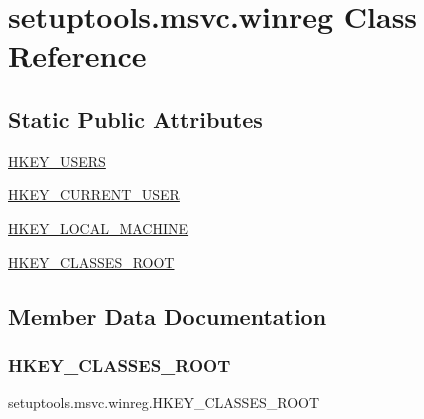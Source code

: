 \hypertarget{classsetuptools_1_1msvc_1_1winreg}{}\section{setuptools.\+msvc.\+winreg Class Reference}
\label{classsetuptools_1_1msvc_1_1winreg}
\subsection*{Static Public Attributes}
\begin{DoxyCompactItemize}
\item 
\hyperlink{classsetuptools_1_1msvc_1_1winreg_a4589470fcc8687a720dbbeffcb07e2d6}{H\+K\+E\+Y\+\_\+\+U\+S\+E\+RS}
\item 
\hyperlink{classsetuptools_1_1msvc_1_1winreg_a873136afb15608b6a5e8d0851167d65e}{H\+K\+E\+Y\+\_\+\+C\+U\+R\+R\+E\+N\+T\+\_\+\+U\+S\+ER}
\item 
\hyperlink{classsetuptools_1_1msvc_1_1winreg_a656edb234e98d04b5eb57233f70a78a2}{H\+K\+E\+Y\+\_\+\+L\+O\+C\+A\+L\+\_\+\+M\+A\+C\+H\+I\+NE}
\item 
\hyperlink{classsetuptools_1_1msvc_1_1winreg_a394ca1161b4e6dc25fe50329c6053b60}{H\+K\+E\+Y\+\_\+\+C\+L\+A\+S\+S\+E\+S\+\_\+\+R\+O\+OT}
\end{DoxyCompactItemize}


\subsection{Member Data Documentation}
\mbox{\label{classsetuptools_1_1msvc_1_1winreg_a394ca1161b4e6dc25fe50329c6053b60}} 
\subsubsection{\texorpdfstring{H\+K\+E\+Y\+\_\+\+C\+L\+A\+S\+S\+E\+S\+\_\+\+R\+O\+OT}{HKEY\_CLASSES\_ROOT}}
{\footnotesize\ttfamily setuptools.\+msvc.\+winreg.\+H\+K\+E\+Y\+\_\+\+C\+L\+A\+S\+S\+E\+S\+\_\+\+R\+O\+OT\hspace{0.3cm}{\ttfamily [static]}}

